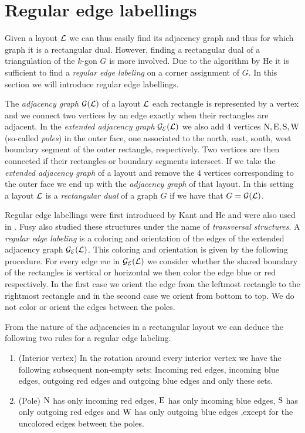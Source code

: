 
\section{Regular edge labellings}
  Given a layout $\mathcal{L}$ we can thus easily find its adjacency graph and thus for which graph it is a rectangular dual. However, finding a rectangular dual of a triangulation of the $k$-gon $G$ is more involved. Due to the algorithm by He \cite{He1993} it is sufficient to find a \emph{regular edge labeling} on a corner assignment of $G$. In this section we will introduce regular edge labellings.

  The \emph{ adjacency graph} $\mathcal{G}(\mathcal{L})$ of a layout $\mathcal{L}$ each rectangle is represented by a vertex and we connect two vertices by an edge exactly when their rectangles are adjacent. In the \emph{extended adjacency graph} $\mathcal{G}_{\mathcal{E}}(\mathcal{L})$ we also add $4$ vertices $\mathrm{N}, \mathrm{E}, \mathrm{S}, \mathrm{W}$ (so-called \emph{poles}) in the outer face, one associated to the north, east, south, west boundary segment of the outer rectangle, respectively. Two vertices are then connected if their rectangles or boundary segments intersect.
  If we take the \emph{extended adjacency graph} of a layout and remove the $4$ vertices corresponding to the outer face we end up with the \emph{adjacency graph} of that layout.
  In this setting a layout $\mathcal{L}$ is a \emph{rectangular dual} of a graph $G$ if we have that $G = \mathcal{G}(\mathcal{L})$.


  Regular edge labellings were first introduced by Kant and He \cite{Kant1997} and were also used in \cite{Eppstein2012}. Fusy also studied these structures \cite{Fusy2006,Fusy2009} under the name of \emph{transversal structures}.
  A \emph{regular edge labeling} is a coloring and orientation of the edges of the extended adjacency graph $\mathcal{G}_{\mathcal{E}}(\mathcal{L})$. This coloring and orientation is given by the following procedure. For every edge $vw$ in $\mathcal{G}_{\mathcal{E}}(\mathcal{L})$ we consider whether the shared boundary of the rectangles is vertical or horizontal we then color the edge blue or red respectively. In the first case we orient the edge from the leftmost rectangle to the rightmost rectangle and in the second case we orient from bottom to top. We do not color or orient the edges between the poles.

  From the nature of the adjacencies in a rectangular layout we can deduce the following two rules for a regular edge labeling.
  \begin{enumerate}
    \item (Interior vertex) In the rotation around every interior vertex we have the following subsequent non-empty sets: Incoming red edges, incoming blue edges, outgoing red edges and outgoing blue edges and only these sets.
    \item (Pole) $\mathrm{N}$ has only incoming red edges, $\mathrm{E}$ has only incoming blue edges, $\mathrm{S}$ has only outgoing red edges and $\mathrm{W}$ has only outgoing blue edges ,except for the uncolored edges between the poles.
  \end{enumerate}

